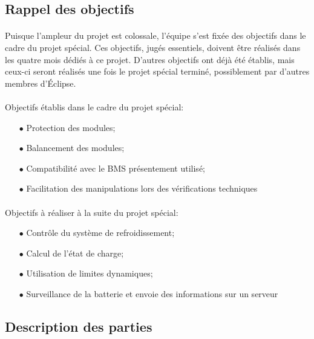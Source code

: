 	\subsection{Rappel des objectifs}
		\paragraph*{}
		Puisque l'ampleur du projet est colossale, l'équipe s'est fixée des objectifs dans le cadre du projet spécial. Ces objectifs, jugés essentiels, doivent être réalisés dans les quatre mois dédiés à ce projet. D'autres objectifs ont déjà été établis, mais ceux-ci seront réalisés une fois le projet spécial terminé, possiblement par d'autres membres d'Éclipse.

		\paragraph*{}
		Objectifs établis dans le cadre du projet spécial:

			\begin{itemize}
				\item[$\bullet$] Protection des modules;
				\item[$\bullet$] Balancement des modules;
				\item[$\bullet$] Compatibilité avec le BMS présentement utilisé;
				\item[$\bullet$] Facilitation des manipulations lors des vérifications techniques
			\end{itemize}

		\paragraph*{}
		Objectifs à réaliser à la suite du projet spécial:

			\begin{itemize}
				\item[$\bullet$] Contrôle du système de refroidissement;
				\item[$\bullet$] Calcul de l'état de charge;
				\item[$\bullet$] Utilisation de limites dynamiques;
				\item[$\bullet$] Surveillance de la batterie et envoie des informations sur un serveur
			\end{itemize}

	\subsection{Description des parties}

